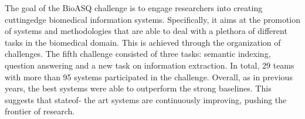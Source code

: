 The goal of the BioASQ challenge is to engage researchers into creating cuttingedge biomedical information systems. Specifically, it aims at the promotion of systems and methodologies that are able to deal with a plethora of different tasks in the biomedical domain. This is achieved through the organization of challenges. The fifth challenge consisted of three tasks: semantic indexing, question answering and a new task on information extraction. In total, 29 teams with more than 95 systems participated in the challenge. Overall, as in previous years, the best systems were able to outperform the strong baselines. This suggests that stateof- the art systems are continuously improving, pushing the frontier of research.
